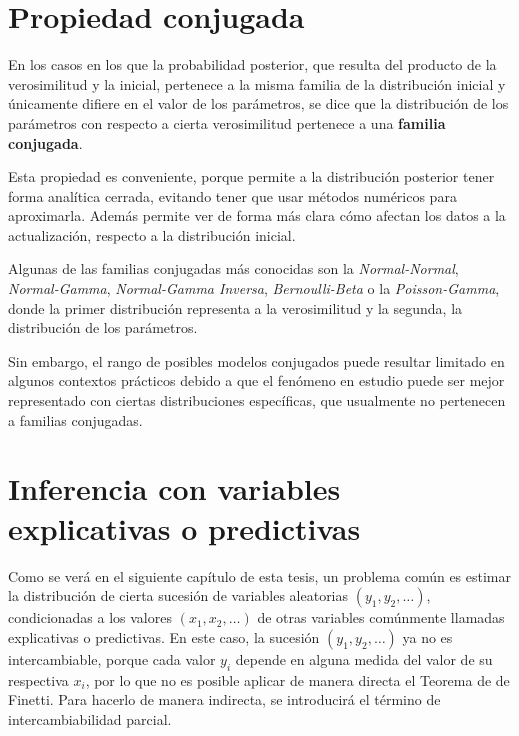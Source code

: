 \section{Propiedad conjugada}

En los casos en los que la probabilidad posterior, que resulta del producto de la verosimilitud y la inicial, pertenece a la misma familia de la distribuci\'on inicial y \'unicamente difiere en el valor de los par\'ametros, se dice que la distribuci\'on de los par\'ametros con respecto a cierta verosimilitud pertenece a una \textbf{familia conjugada}.

Esta propiedad es conveniente, porque permite a la distribuci\'on posterior tener forma anal\'itica cerrada, evitando tener que usar m\'etodos num\'ericos para aproximarla. Adem\'as permite ver de forma m\'as clara c\'omo afectan los datos a la actualizaci\'on, respecto a la distribuci\'on inicial.

Algunas de las familias conjugadas m\'as conocidas son la \textit{Normal-Normal}, \textit{Normal-Gamma}, \textit{Normal-Gamma Inversa}, \textit{Bernoulli-Beta} o la \textit{Poisson-Gamma}, donde la primer distribuci\'on representa a la verosimilitud y la segunda, la distribuci\'on de los par\'ametros. 

Sin embargo, el rango de posibles modelos conjugados puede resultar limitado en algunos contextos pr\'acticos debido a que el fen\'omeno en estudio puede ser mejor representado con ciertas distribuciones espec\'ificas, que usualmente no pertenecen a familias conjugadas.

\section[Inferencia con variables explicativas o predictivas]{Inferencia con variables explicativas o predictivas\raisebox{.3\baselineskip}{\normalsize\footnotemark}}

Como se ver\'a en el siguiente cap\'itulo de esta tesis, un problema com\'un es estimar la distribuci\'on de cierta sucesi\'on de variables aleatorias $(y_1,y_2,\ldots)$, condicionadas a los valores $(x_1,x_2,\ldots)$ de otras variables com\'unmente llamadas explicativas o predictivas. En este caso, la sucesi\'on $(y_1,y_2,\ldots)$ ya no es intercambiable, porque cada valor $y_i$ depende en alguna medida del valor de su respectiva $x_i$, por lo que no es posible aplicar de manera directa el Teorema de de Finetti. Para hacerlo de manera indirecta, se introducir\'a el t\'ermino de intercambiabilidad parcial.

